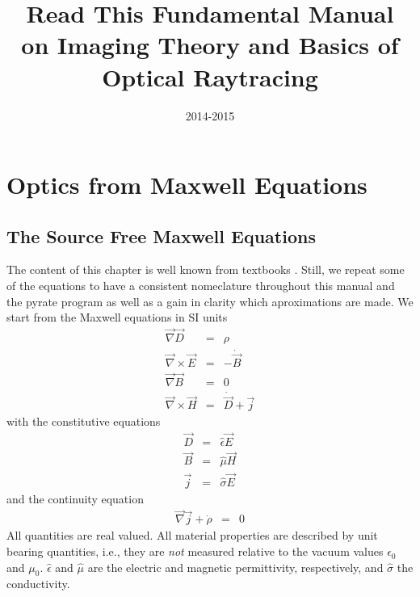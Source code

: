 \documentclass[12pt,a4paper,twoside,openright,BCOR10mm,headsepline,titlepage,abstracton,chapterprefix,final]{scrreprt}
\newcommand\vacuum{0}
\newcommand\Vector[1]{\vec{#1}}
\newcommand\Nabla{\Vector{\nabla}}
\newcommand\timederivative[1]{\dot{{#1}}}
\newcommand\Tensor[1]{\hat{#1}}
\newcommand\scalarEfield{E}
\newcommand\scalarBfield{B}
\newcommand\scalarHfield{H}
\newcommand\scalarDfield{D}
\newcommand\Efield{\Vector{\scalarEfield}}
\newcommand\Bfield{\Vector{\scalarBfield}}
\newcommand\Hfield{\Vector{\scalarHfield}}
\newcommand\Dfield{\Vector{\scalarDfield}}
\newcommand\permeability{\Tensor{\mu}}
\newcommand\vacuumpermeability{\mu_{\vacuum}}
\newcommand\permittivity{\Tensor{\epsilon}}
\newcommand\vacuumpermittivity{\epsilon_{\vacuum}}
\newcommand\conductivity{\Tensor{\sigma}}
\newcommand\currentdensity{\Vector{j}}
\newcommand\chargedensity{\rho}
\begin{document}
\titlehead{ }
\subject{Pyrate -- Optical raytracing based on Python}
\title{Read This Fundamental Manual \\ on Imaging Theory and Basics of Optical Raytracing}
\author{}
\date{2014-2015}
\publishers{}
\maketitle

\onehalfspacing

\chapter{Optics from Maxwell Equations}
\section{The Source Free Maxwell Equations}
The content of this chapter is well known from textbooks \cite{Jackson}. Still, we repeat some of the equations to have a consistent nomeclature throughout this manual and the pyrate program
as well as a gain in clarity which aproximations are made.
We start from the Maxwell equations in SI units
\begin{subequations}\label{eq:Maxwell}
\begin{eqnarray}
  \Nabla \Dfield &=& \chargedensity 							\label{eq:MaxwellNablaD}\\
  \Nabla \times \Efield &=& - \timederivative{\Bfield}  					\label{eq:MaxwellNablaCrossE}\\
  \Nabla \Bfield &=& 0  									\label{eq:MaxwellNablaB}\\
  \Nabla \times \Hfield &=& \timederivative{\Dfield} + \currentdensity  		\label{eq:MaxwellNablaCrossH}
\end{eqnarray}
\end{subequations}
with the constitutive equations
\begin{subequations}\label{eq:Material}
\begin{eqnarray}
  \Dfield &=& \permittivity \Efield 								\label{eq:ConstitutiveEpsilon}\\
  \Bfield &=& \permeability \Hfield 								\label{eq:ConstitutiveMu}\\
  \currentdensity &=& \conductivity \Efield						\label{eq:ConstitutiveSigma}
\end{eqnarray}
\end{subequations}
and the continuity equation
\begin{eqnarray}
  \Nabla \currentdensity + \timederivative{\chargedensity} &=& 0		\label{eq:continuity}
\end{eqnarray}
All quantities are real valued.
All material properties are described by unit bearing quantities, i.e., they are \emph{not} measured relative to the vacuum values $\vacuumpermittivity$ and $\vacuumpermeability$. $\permittivity$ and $\permeability$ are the electric and magnetic permittivity, respectively, and $\conductivity$ the conductivity. 
\end{document}

